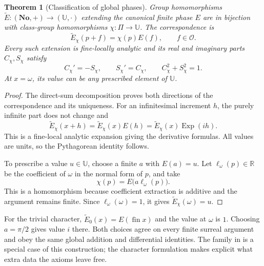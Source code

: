 \documentclass[11pt,letterpaper]{article}
\newtheorem{theorem}{Theorem}[section]
\theoremstyle{definition}
\theoremstyle{remark}
\newcommand{\No}{\mathbf{No}}
\newcommand{\R}{\mathbb R}\newcommand{\C}{\mathbb C}
\newcommand{\OO}{\mathcal O}\newcommand{\mm}{\mathfrak m}
\newcommand{\U}{\mathbb U}\newcommand{\PP}{\mathbb P}
\newcommand{\fin}{\operatorname{fin}}
\newcommand{\Exp}{\operatorname{Exp}}\newcommand{\Log}{\operatorname{Log}}
\numberwithin{equation}{section}
\begin{document}
\begin{theorem}[Classification of global phases]\label{thm:globalphase}
Group homomorphisms $\widetilde E:(\No,+)\to(\U,\cdot)$ extending the canonical finite phase $E$ are in bijection with class-group homomorphisms $\chi:\Pi\to\U$. The correspondence is
\begin{equation}\label{eq:globalphase}
 \widetilde E_\chi(p+f)=\chi(p)E(f),\qquad f\in\OO.
\end{equation}
Every such extension is fine-locally analytic and its real and imaginary parts $C_\chi,S_\chi$ satisfy
\[
 C_\chi'= -S_\chi,\qquad S_\chi'=C_\chi,
 \qquad C_\chi^2+S_\chi^2=1.
\]
At $x=\omega$, its value can be any prescribed element of $\U$.
\end{theorem}
\begin{proof}
The direct-sum decomposition proves both directions of the correspondence and its uniqueness. For an infinitesimal increment $h$, the purely infinite part does not change and
\[
 \widetilde E_\chi(x+h)=\widetilde E_\chi(x)E(h)
 =\widetilde E_\chi(x)\Exp(ih).
\]
This is a fine-local analytic expansion giving the derivative formulas. All values are units, so the Pythagorean identity follows.

To prescribe a value $u\in\U$, choose a finite $a$ with $E(a)=u$. Let $\ell_\omega(p)\in\R$ be the coefficient of $\omega$ in the normal form of $p$, and take
\[
 \chi(p)=E\bigl(a\ell_\omega(p)\bigr).
\]
This is a homomorphism because coefficient extraction is additive and the argument remains finite. Since $\ell_\omega(\omega)=1$, it gives $\widetilde E_\chi(\omega)=u$.
\end{proof}
For the trivial character, $\widetilde E_0(x)=E(\fin x)$ and the value at $\omega$ is $1$. Choosing $a=\pi/2$ gives value $i$ there. Both choices agree on every finite surreal argument and obey the same global addition and differential identities. The family in \cite{SourceAnalysis} is a special case of this construction; the character formulation makes explicit what extra data the axioms leave free.
\end{document}
